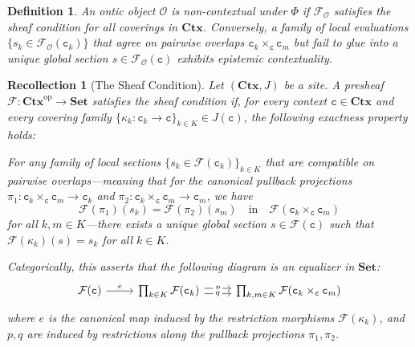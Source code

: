 \documentclass{article}
\newtheorem{dn}{Definition}
\newtheorem{rc}{Recollection}
\numberwithin{tm}{section}
\numberwithin{dn}{section}
\numberwithin{as}{section}
\numberwithin{rk}{section}
\numberwithin{lem}{section}
\numberwithin{ax}{section}
\numberwithin{pp}{section}
\numberwithin{eg}{section}
\numberwithin{war}{section}
\numberwithin{equation}{section}
\numberwithin{prop}{section}
\numberwithin{nt}{section}
\numberwithin{rc}{section}
\def\code#1{\texttt{#1}}
\begin{document}
\begin{dn}
	An ontic object $\mathcal{O}$ is \emph{non-contextual} under $\Phi$ if $\mathcal{F}_\mathcal{O}$ satisfies the sheaf condition for all coverings in $\mathbf{Ctx}$. Conversely, a family of local evaluations $\{s_k \in \mathcal{F}_\mathcal{O}(\code{c}_k)\}$ that agree on pairwise overlaps $\code{c}_k \times_\code{c} \code{c}_m$ but fail to glue into a unique global section $s \in \mathcal{F}_\mathcal{O}(\code{c})$ exhibits \emph{epistemic contextuality}.
\end{dn}

\begin{rc}[The Sheaf Condition] \label{SheafCondition}
	Let $(\mathbf{Ctx}, J)$ be a site. A presheaf $\mathcal{F}: \mathbf{Ctx}^{\text{op}} \to \mathbf{Set}$ satisfies the \emph{sheaf condition} if, for every context $\code{c} \in \mathbf{Ctx}$ and every covering family $\{\kappa_k: \code{c}_k \to \code{c}\}_{k \in K} \in J(\code{c})$, the following exactness property holds:
	
	For any family of local sections $\{s_k \in \mathcal{F}(\code{c}_k)\}_{k \in K}$ that are compatible on pairwise overlaps---meaning that for the canonical pullback projections $\pi_1: \code{c}_k \times_\code{c} \code{c}_m \to \code{c}_k$ and $\pi_2: \code{c}_k \times_\code{c} \code{c}_m \to \code{c}_m$, we have
	\begin{equation}
		\mathcal{F}(\pi_1)(s_k) = \mathcal{F}(\pi_2)(s_m) \quad \text{in} \quad \mathcal{F}(\code{c}_k \times_\code{c} \code{c}_m)
	\end{equation}
	for all $k, m \in K$---there exists a \emph{unique} global section $s \in \mathcal{F}(\code{c})$ such that $\mathcal{F}(\kappa_k)(s) = s_k$ for all $k \in K$.
	
	Categorically, this asserts that the following diagram is an equalizer in $\mathbf{Set}$:
	\begin{equation}
		\begin{tikzcd}
			\mathcal{F}(\code{c}) \arrow[r, "e"] & \prod_{k \in K} \mathcal{F}(\code{c}_k) \arrow[r, "p" description, shift left] \arrow[r, "q" description, shift right] & \prod_{k,m \in K} \mathcal{F}(\code{c}_k \times_\code{c} \code{c}_m)
		\end{tikzcd}
	\end{equation}
	where $e$ is the canonical map induced by the restriction morphisms $\mathcal{F}(\kappa_k)$, and $p, q$ are induced by restrictions along the pullback projections $\pi_1, \pi_2$.
\end{rc}
\end{document}
